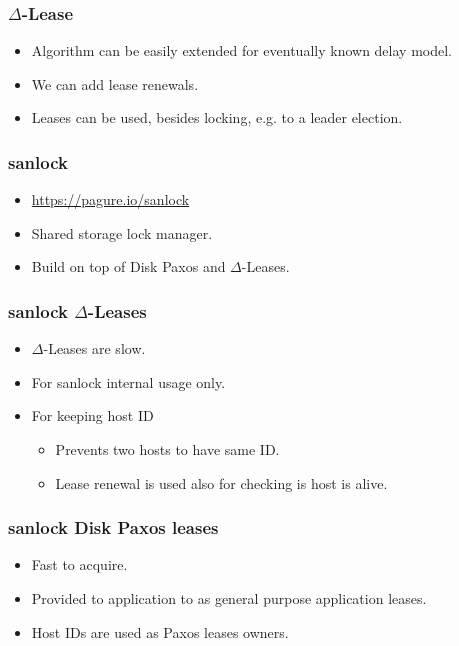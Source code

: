 \documentclass[10pt,utf8]{beamer}
\begin{document}
\begin{frame}
    \frametitle{$\Delta$-Lease}
    \begin{itemize}
     \item Algorithm can be easily extended for eventually known delay model.
     \item We can add lease renewals.
     \item Leases can be used, besides locking, e.g. to a leader election.
    \end{itemize}
\end{frame}


\begin{frame}
    \frametitle{sanlock}
    \begin{itemize}
     \item \color{blue}\url{https://pagure.io/sanlock}\color{black}
     \item Shared storage lock manager.
     \item Build on top of Disk Paxos and $\Delta$-Leases.
    \end{itemize}
\end{frame}

\begin{frame}
    \frametitle{sanlock $\Delta$-Leases}
    \begin{itemize}
     \item $\Delta$-Leases are slow.
     \item For sanlock internal usage only.
     \item For keeping host ID
     \begin{itemize}
        \item Prevents two hosts to have same ID.
        \item Lease renewal is used also for checking is host is alive.
     \end{itemize}
    \end{itemize}
\end{frame}

\begin{frame}
    \frametitle{sanlock Disk Paxos leases}
    \begin{itemize}
     \item Fast to acquire.
     \item Provided to application to as general purpose application leases.
     \item Host IDs are used as Paxos leases owners.
    \end{itemize}
\end{frame}
\end{document}
